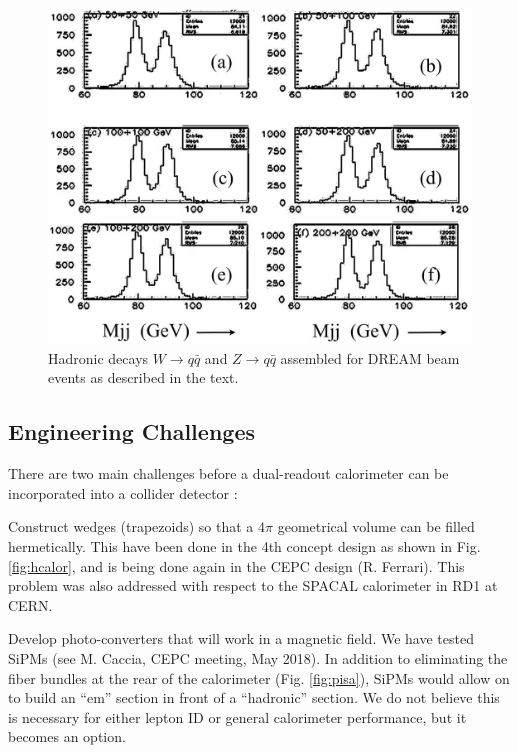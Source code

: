 \begin{figure}
 \centering
 \includegraphics[scale=0.45]{Calorimeter/DualReadout/WZ-Dream-data-all.jpg}
  \caption{Hadronic decays $W \rightarrow q\bar{q}$ and  $Z \rightarrow q\bar{q}$ assembled for DREAM beam events as described in the text.}
  \label{fig:wz}
\end{figure}


\subsection{Engineering Challenges}


There are two main challenges before a dual-readout calorimeter can be incorporated into a collider detector \cite{cepc}:

\begin{description}

\item Construct wedges (trapezoids) so that a $4 \pi$ geometrical volume can be filled hermetically.   This have been done in the 4th concept design \cite{4th} as shown in Fig. \ref{fig:hcalor}, and is being done again in the CEPC design (R. Ferrari).  This problem was also addressed with respect to the SPACAL calorimeter in RD1 at CERN.

\item Develop photo-converters that will work in a magnetic field.  We have tested SiPMs (see M. Caccia, CEPC meeting, May 2018).  In addition to eliminating the fiber bundles at the rear of the calorimeter (Fig. \ref{fig:pisa}), SiPMs would allow on to build an ``em'' section in front of a ``hadronic'' section.  We do not believe this is necessary for either lepton ID or general calorimeter performance, but it becomes an option. 
 
 \end{description}
 
